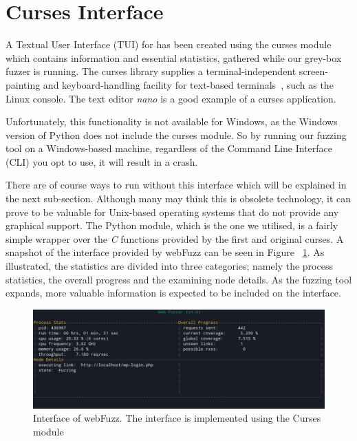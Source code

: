 \section{Curses Interface}
A Textual User Interface (TUI) for \pname{} has been created using the curses module which contains information and essential statistics, gathered while our grey-box fuzzer is running. The curses library supplies a terminal-independent screen-painting and keyboard-handling facility for text-based terminals~\cite{curses}, such as the Linux console. The text editor \textit{nano} is a good example of a curses application. 

Unfortunately, this functionality is not available for Windows, as the Windows version of Python does not include the curses module. So by running our fuzzing tool on a Windows-based machine, regardless of the Command Line Interface (CLI) you opt to use, it will result in a crash. 

There are of course ways to run \pname{} without this interface which will be explained in the next sub-section. Although many may think this is obsolete technology, it can prove to be  valuable for Unix-based operating systems that do not provide any graphical support. The Python module, which is the one we utilised, is a fairly simple wrapper over the \textit{C} functions provided by the first and original curses. A snapshot of the interface provided by webFuzz can be seen in Figure ~\ref{fig:curses_interface}. As illustrated, the statistics are divided into three categories; namely the process statistics, the overall progress and the examining node details.
As the fuzzing tool expands, more valuable information is expected to be included on the interface.

\begin{figure}[ht]
 \centering
 \captionsetup{justification=centering}
 \includegraphics[width=\linewidth]{figures/curses.png}
 \caption[Interface of webFuzz]
 {Interface of webFuzz. The interface is implemented using the Curses module}
 \label{fig:curses_interface}
\end{figure}

